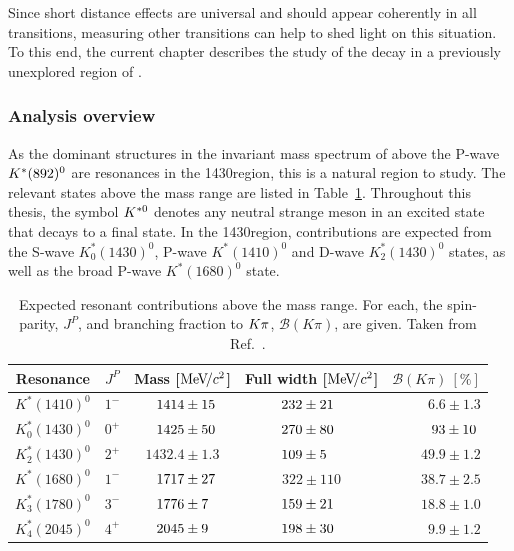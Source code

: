 Since short distance effects are universal and should appear coherently in all \btosmm transitions, measuring other \btosmm transitions can help to shed light on this situation. To this end, the current chapter describes the study of the decay \BdToKpimm in a previously unexplored region of \mkpi.


\subsubsection{Analysis overview}

As the dominant structures in the \kpi invariant mass spectrum of \BdToKpimm above the P-wave ${{K}^*}(892)^{0}$ are resonances in the 1430\mevcc region, this is a natural region to study. The relevant \Kstarz states above the \KstP mass range are listed in Table~\ref{tab:introduction:states}. Throughout this thesis, the symbol ${{K}^{*0}}$ denotes any neutral strange meson in an excited state that decays to a \Kp\pim final state. In the 1430\mevcc region, contributions are expected from the S-wave $K^\ast_0(1430)^0$, P-wave $K^\ast(1410)^0$ and D-wave $K^\ast_2(1430)^0$ states, as well as the broad P-wave $K^\ast(1680)^0$ state. 

\begin{table}[!tb]
\caption{Expected resonant contributions above the \KstP mass range. For each, the spin-parity, $J^P$, and branching fraction to ${K}{\pi}$, $\mathcal{B}(K\pi)$, are given. Taken from Ref.~\cite{lu-wang}.}
\label{tab:introduction:states}
\centering
\begin{tabular}{c|c|c|c|r}
    Resonance & $J^{P}$ & Mass [$\mathrm{Me\kern -0.1em V\!/}c^2$] & Full width [$\mathrm{Me\kern -0.1em V\!/}c^2$]  & $\mathcal{B}(K\pi)~[\%]$ \\
   \hline
   $K^\ast(1410)^0$ & $1^{-}$& $\hphantom{0.}1414 \pm 15\hphantom{.}$& $232 \pm 21\hphantom{0}$  & $6.6 \pm 1.3$ \\
   $K^\ast_0(1430)^0$ & $0^{+}$ & $\hphantom{0.}1425 \pm 50\hphantom{.}$ & $270 \pm 80\hphantom{0}$ & $\hphantom{.}93 \pm 10\hphantom{.}$ \\
   $K^\ast_2(1430)^0$ & $2^{+}$ & $1432.4\pm 1.3$ & $109 \pm 5\hphantom{00}$ & $49.9 \pm 1.2$ \\
   $K^\ast(1680)^0$ & $1^{-}$ & $\hphantom{0.}1717 \pm 27\hphantom{.}$ & $322 \pm 110$ & $38.7 \pm 2.5$ \\
   $K^\ast_3(1780)^0$ & $3^{-}$ & $\hphantom{0.}1776 \pm 7\hphantom{0.}$ & $159 \pm 21\hphantom{0}$ & $18.8 \pm 1.0$ \\
   $K^\ast_4(2045)^0$ & $4^{+}$ & $\hphantom{0.}2045 \pm 9\hphantom{0.}$ & $198 \pm 30\hphantom{0}$ & $9.9 \pm 1.2$ \\
 \end{tabular}
 \end{table}

